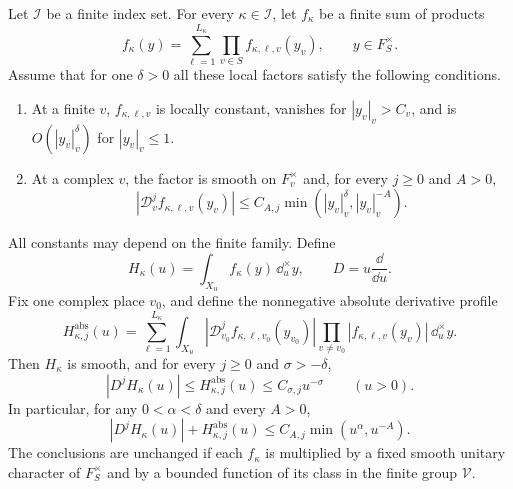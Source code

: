 \begin{lemma}\label{lem:sheet-profile}
Let \(\mathcal I\) be a finite index set.  For every
\(\kappa\in\mathcal I\), let \(f_\kappa\) be a finite sum of products
\[
 f_\kappa(y)=\sum_{\ell=1}^{L_\kappa}
                \prod_{v\in S}f_{\kappa,\ell,v}(y_v),
 \qquad y\in F_S^\times.
\]
Assume that for one \(\delta>0\) all these local factors satisfy the
following conditions.

\begin{enumerate}[label=\textup{(\alph*)}]
\item At a finite \(v\), \(f_{\kappa,\ell,v}\) is locally constant,
  vanishes for \(|y_v|_v>C_v\), and is
  \(O(|y_v|_v^\delta)\) for \(|y_v|_v\le1\).
\item At a complex \(v\), the factor is smooth on \(F_v^\times\) and, for
  every \(j\ge0\) and \(A>0\),
  \[
   |\mathcal D_v^j f_{\kappa,\ell,v}(y_v)|
      \le C_{A,j}\min(|y_v|_v^\delta,|y_v|_v^{-A}).
  \]
\end{enumerate}
All constants may depend on the finite family.  Define
\[
 H_\kappa(u)=\int_{X_u}f_\kappa(y)\,\dd^\times_u y,\qquad
 D=u\frac{\dd}{\dd u}.
\]
Fix one complex place \(v_0\), and define the nonnegative absolute
derivative profile
\[
 H^{\mathrm{abs}}_{\kappa,j}(u)
 =\sum_{\ell=1}^{L_\kappa}\int_{X_u}
   |\mathcal D_{v_0}^j f_{\kappa,\ell,v_0}(y_{v_0})|
   \prod_{v\ne v_0}|f_{\kappa,\ell,v}(y_v)|\,\dd^\times_u y.
\]
Then \(H_\kappa\) is smooth, and for every \(j\ge0\) and
\(\sigma>-\delta\),
\begin{equation}\label{eq:sheet-weighted-bound}
 |D^jH_\kappa(u)|\le H^{\mathrm{abs}}_{\kappa,j}(u)
      \le C_{\sigma,j}u^{-\sigma}\qquad(u>0).
\end{equation}
In particular, for any \(0<\alpha<\delta\) and every \(A>0\),
\begin{equation}\label{eq:sheet-two-ended-bound}
 |D^jH_\kappa(u)|+H^{\mathrm{abs}}_{\kappa,j}(u)
    \le C_{A,j}\min(u^\alpha,u^{-A}).
\end{equation}
The conclusions are unchanged if each \(f_\kappa\) is multiplied by
a fixed smooth unitary character of \(F_S^\times\) and by a bounded function
of its class in the finite group \(\mathcal V\).


\end{lemma}
